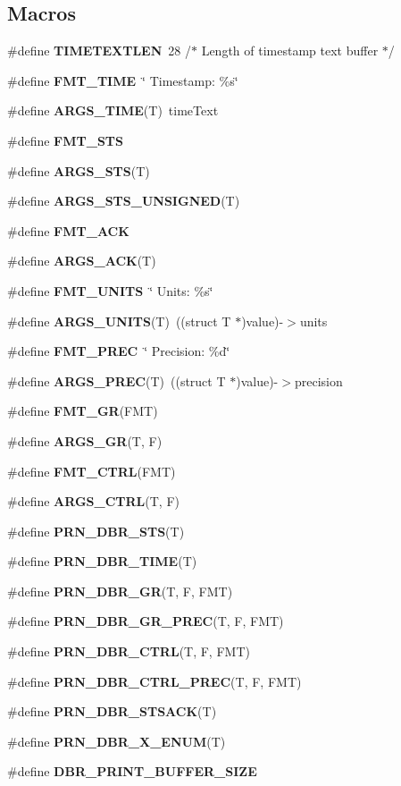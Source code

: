\subsection*{Macros}
\begin{DoxyCompactItemize}
\item 
\#define \textbf{ T\+I\+M\+E\+T\+E\+X\+T\+L\+EN}~28          /$\ast$ Length of timestamp text buffer $\ast$/
\item 
\#define \textbf{ F\+M\+T\+\_\+\+T\+I\+ME}~\char`\"{}    Timestamp\+:        \%s\char`\"{}
\item 
\#define \textbf{ A\+R\+G\+S\+\_\+\+T\+I\+ME}(T)~time\+Text
\item 
\#define \textbf{ F\+M\+T\+\_\+\+S\+TS}
\item 
\#define \textbf{ A\+R\+G\+S\+\_\+\+S\+TS}(T)
\item 
\#define \textbf{ A\+R\+G\+S\+\_\+\+S\+T\+S\+\_\+\+U\+N\+S\+I\+G\+N\+ED}(T)
\item 
\#define \textbf{ F\+M\+T\+\_\+\+A\+CK}
\item 
\#define \textbf{ A\+R\+G\+S\+\_\+\+A\+CK}(T)
\item 
\#define \textbf{ F\+M\+T\+\_\+\+U\+N\+I\+TS}~\char`\"{}    Units\+:            \%s\char`\"{}
\item 
\#define \textbf{ A\+R\+G\+S\+\_\+\+U\+N\+I\+TS}(T)~((struct T $\ast$)value)-\/$>$units
\item 
\#define \textbf{ F\+M\+T\+\_\+\+P\+R\+EC}~\char`\"{}    Precision\+:        \%d\char`\"{}
\item 
\#define \textbf{ A\+R\+G\+S\+\_\+\+P\+R\+EC}(T)~((struct T $\ast$)value)-\/$>$precision
\item 
\#define \textbf{ F\+M\+T\+\_\+\+GR}(F\+MT)
\item 
\#define \textbf{ A\+R\+G\+S\+\_\+\+GR}(T,  F)
\item 
\#define \textbf{ F\+M\+T\+\_\+\+C\+T\+RL}(F\+MT)
\item 
\#define \textbf{ A\+R\+G\+S\+\_\+\+C\+T\+RL}(T,  F)
\item 
\#define \textbf{ P\+R\+N\+\_\+\+D\+B\+R\+\_\+\+S\+TS}(T)
\item 
\#define \textbf{ P\+R\+N\+\_\+\+D\+B\+R\+\_\+\+T\+I\+ME}(T)
\item 
\#define \textbf{ P\+R\+N\+\_\+\+D\+B\+R\+\_\+\+GR}(T,  F,  F\+MT)
\item 
\#define \textbf{ P\+R\+N\+\_\+\+D\+B\+R\+\_\+\+G\+R\+\_\+\+P\+R\+EC}(T,  F,  F\+MT)
\item 
\#define \textbf{ P\+R\+N\+\_\+\+D\+B\+R\+\_\+\+C\+T\+RL}(T,  F,  F\+MT)
\item 
\#define \textbf{ P\+R\+N\+\_\+\+D\+B\+R\+\_\+\+C\+T\+R\+L\+\_\+\+P\+R\+EC}(T,  F,  F\+MT)
\item 
\#define \textbf{ P\+R\+N\+\_\+\+D\+B\+R\+\_\+\+S\+T\+S\+A\+CK}(T)
\item 
\#define \textbf{ P\+R\+N\+\_\+\+D\+B\+R\+\_\+\+X\+\_\+\+E\+N\+UM}(T)
\item 
\#define \textbf{ D\+B\+R\+\_\+\+P\+R\+I\+N\+T\+\_\+\+B\+U\+F\+F\+E\+R\+\_\+\+S\+I\+ZE}
\end{DoxyCompactItemize}
